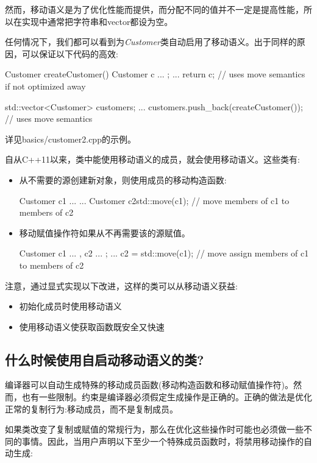 然而，移动语义是为了优化性能而提供，而分配不同的值并不一定是提高性能，所以在实现中通常把字符串和vector都设为空。

任何情况下，我们都可以看到为\textit{Customer}类自动启用了移动语义。出于同样的原因，可以保证以下代码的高效:

\begin{cppcode}
Customer createCustomer()
{
	Customer c{ ... };
	...
	return c; // uses move semantics if not optimized away
}

std::vector<Customer> customers;
...
customers.push_back(createCustomer()); // uses move semantics
\end{cppcode}

详见basics/customer2.cpp的示例。

自从C++11以来，类中能使用移动语义的成员，就会使用移动语义。这些类有:

\begin{itemize}
	\item 从不需要的源创建新对象，则使用成员的移动构造函数:

	\begin{cppcode}
Customer c1{ ... }
...
Customer c2{std::move(c1)}; // move members of c1 to members of c2
	\end{cppcode}
	\item 移动赋值操作符如果从不再需要该的源赋值。

	\begin{cppcode}
Customer c1{ ... }, c2{ ... };
...
c2 = std::move(c1); // move assign members of c1 to members of c2
	\end{cppcode}
\end{itemize}

注意，通过显式实现以下改进，这样的类可以从移动语义获益:

\begin{itemize}
	\item 初始化成员时使用移动语义
	\item 使用移动语义使获取函数既安全又快速
\end{itemize}

\subsection{什么时候使用自启动移动语义的类?}

编译器可以自动生成特殊的移动成员函数(移动构造函数和移动赋值操作符)。然而，也有一些限制。约束是编译器必须假定生成操作是正确的。正确的做法是优化正常的复制行为:移动成员，而不是复制成员。

如果类改变了复制或赋值的常规行为，那么在优化这些操作时可能也必须做一些不同的事情。因此，当用户声明以下至少一个特殊成员函数时，将禁用移动操作的自动生成:

